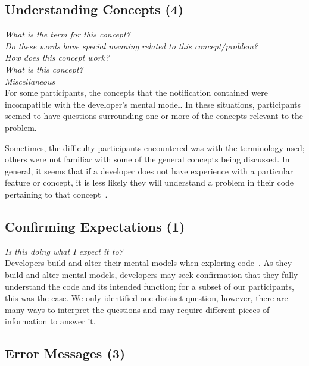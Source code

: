 \documentclass[conference]{IEEEtran}
\begin{document}

\noindent\subsection{\textbf{Understanding Concepts (4)}}

\noindent\emph{What is the term for this concept?} \\
\emph{Do these words have special meaning related to this concept/problem?} \\
\emph{How does this concept work?} \\
\emph{What is this concept?} \\
\emph{Miscellaneous} \\

For some participants, the concepts that the notification contained were incompatible with the developer's mental model. In these situations, participants seemed to have questions surrounding one or more of the concepts relevant to the problem.

Sometimes, the difficulty participants encountered was with the terminology used; others were not familiar with some of the general concepts being discussed. In general, it seems that if a developer does not have experience with a particular feature or concept, it is less likely they will understand a problem in their code pertaining to that concept~\cite{}.%



\noindent\subsection{\textbf{Confirming Expectations (1)}}

\noindent\emph{Is this doing what I expect it to?} \\

Developers build and alter their mental models when exploring code~\cite{canas1994mental, burkhardt1997mental}. As they build and alter mental models, developers may seek confirmation that they fully understand the code and its intended function; for a subset of our participants, this was the case. We only identified one distinct question, however, there are many ways to interpret the questions and may require different pieces of information to answer it.


\noindent\subsection{\textbf{Error Messages (3)}}
\end{document}
